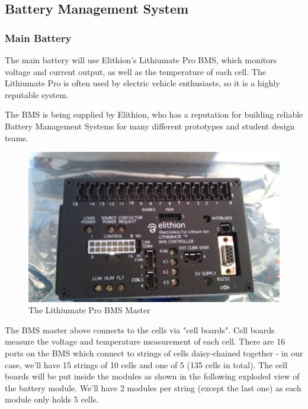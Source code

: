 \documentclass[main.tex]{subfiles}
\begin{document}
    \subsection{Battery Management System}
    \subsubsection{Main Battery}
   	The main battery will use Elithion's Lithiumate Pro BMS, which monitors voltage and current output, as well as the temperature of each cell. The Lithiumate Pro is often used by electric vehicle enthusiasts, so it is a highly reputable system.

    The BMS is being supplied by Elithion, who has a reputation for building reliable Battery Management Systems for many different prototypes and student design teams.


     \begin{figure}[H]
        \centering
        \includegraphics[width=\linewidth]{images/lithiumate_pro}
        \caption{The Lithiumate Pro BMS Master}
        \label{fig:bms-master}
    \end{figure}

 	The BMS master above connects to the cells via "cell boards".  Cell boards measure the voltage and temperature measurement of each cell. There are 16 ports on the BMS which connect to strings of cells daisy-chained together - in our case, we'll have 15 strings of 10 cells and one of 5 (135 cells in total). The cell boards will be put inside the modules as shown in the following exploded view of the battery module. We'll have 2 modules per string (except the last one) as each module only holds 5 cells.
\end{document}
